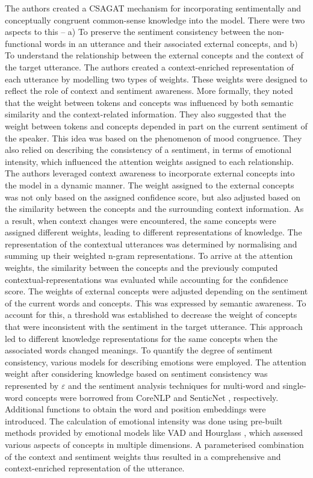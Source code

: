 The authors created a CSAGAT mechanism for incorporating sentimentally and conceptually congruent common-sense knowledge into the model. There were two aspects to this -- a) To preserve the sentiment consistency between the non-functional words in an utterance and their associated external concepts, and b) To understand the relationship between the external concepts and the context of the target utterance. The authors created a context-enriched representation of each utterance by modelling two types of weights. These weights were designed to reflect the role of context and sentiment awareness. More formally, they noted that the weight between tokens and concepts was influenced by both semantic similarity and the context-related information. They also suggested that the weight between tokens and concepts depended in part on the current sentiment of the speaker. This idea was based on the phenomenon of mood congruence. They also relied on describing the consistency of a sentiment, in terms of emotional intensity, which influenced the attention weights assigned to each relationship. The authors leveraged context awareness to incorporate external concepts into the model in a dynamic manner. The weight assigned to the external concepts was not only based on the assigned confidence score, but also adjusted based on the similarity between the concepts and the surrounding context information. As a result, when context changes were encountered, the same concepts were assigned different weights, leading to different representations of knowledge. The representation of the contextual utterances was determined by normalising and summing up their weighted n-gram representations. To arrive at the attention weights, the similarity between the concepts and the previously computed contextual-representations was evaluated while accounting for the confidence score. The weights of external concepts were adjusted depending on the sentiment of the current words and concepts. This was expressed by semantic awareness. To account for this, a threshold was established to decrease the weight of concepts that were inconsistent with the sentiment in the target utterance. This approach led to different knowledge representations for the same concepts when the associated words changed meanings. To quantify the degree of sentiment consistency, various models for describing emotions were employed. The attention weight after considering knowledge based on sentiment consistency was represented by $\varepsilon$ and the sentiment analysis techniques for multi-word and single-word concepts were borrowed from CoreNLP \cite{pennington-etal-2014-glove} and SenticNet \cite{Cambria2020SenticNet6E}, respectively. 
Additional functions to obtain the word and position embeddings were introduced. The calculation of emotional intensity was done using pre-built methods provided by emotional models like VAD \cite{Mehrabian1996PleasurearousaldominanceAG} and Hourglass \cite{Susanto2020TheHM}, which assessed various aspects of concepts in multiple dimensions. A parameterised combination of the context and sentiment weights thus resulted in a comprehensive and context-enriched representation of the utterance.

